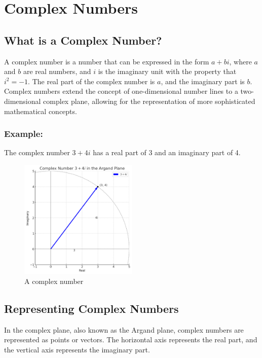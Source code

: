 \documentclass[
]{article}
\author{}
\date{}
\let\oldsection\section
\renewcommand{\section}[1]{\clearpage\oldsection{#1}}
\begin{document}
\section{Complex Numbers}\label{complex-numbers}

\subsection{What is a Complex Number?}\label{what-is-a-complex-number}

A complex number is a number that can be expressed in the form
\(a + bi\), where \(a\) and \(b\) are real numbers, and \(i\) is the
imaginary unit with the property that \(i^2 = -1\). The real part of the
complex number is \(a\), and the imaginary part is \(b\). Complex
numbers extend the concept of one-dimensional number lines to a
two-dimensional complex plane, allowing for the representation of more
sophisticated mathematical concepts.

\subsubsection{Example:}\label{example}

The complex number \(3 + 4i\) has a real part of 3 and an imaginary part
of 4.

\begin{figure}
\centering
\includegraphics[width=0.5\textwidth,height=\textheight]{complex-number.png}
\caption{A complex number}
\end{figure}

\subsection{Representing Complex
Numbers}\label{representing-complex-numbers}

In the complex plane, also known as the Argand plane, complex numbers
are represented as points or vectors. The horizontal axis represents the
real part, and the vertical axis represents the imaginary part.
\end{document}
